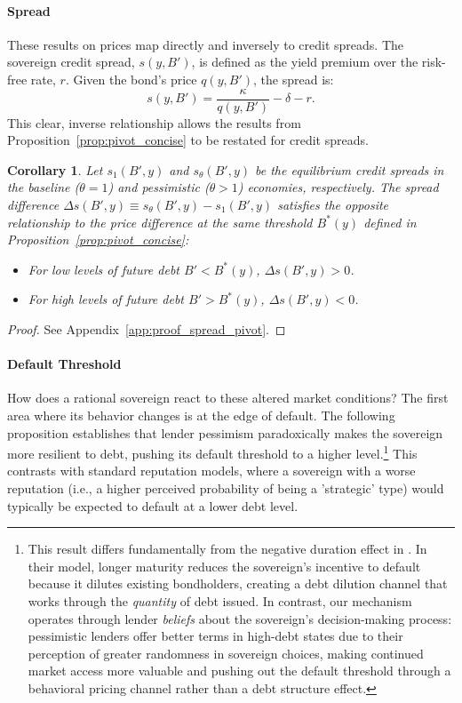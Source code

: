 \documentclass[12pt]{article}
\theoremstyle{plain}
\newtheorem{corollary}{Corollary}
\begin{document}
\paragraph{Spread}
These results on prices map directly and inversely to credit spreads. The
sovereign credit spread, $s(y, B')$, is defined as the yield premium over the
risk-free rate, $r$. Given the bond's price $q(y, B')$, the spread is:
\begin{equation}
	s(y, B') = \frac{\kappa}{q(y, B')} - \delta - r.
	\label{eq:spread_definition}
\end{equation}
This clear, inverse relationship allows the results from Proposition~\ref{prop:pivot_concise} to be restated for credit spreads.

\begin{corollary}
	\label{cor:spread_pivot}
	Let $s_1(B', y)$ and $s_\theta(B', y)$ be the equilibrium credit spreads in the baseline ($\theta=1$) and pessimistic ($\theta>1$) economies, respectively. The spread difference $\Delta s(B', y) \equiv s_\theta(B', y) - s_1(B', y)$ satisfies the opposite relationship to the price difference at the same threshold $B^*(y)$ defined in Proposition~\ref{prop:pivot_concise}:
	\begin{itemize}
		\item For low levels of future debt $B' < B^*(y)$, $\Delta s(B', y) > 0$.
		\item For high levels of future debt $B' > B^*(y)$, $\Delta s(B', y) < 0$.
	\end{itemize}
\end{corollary}

\begin{proof}
	See Appendix~\ref{app:proof_spread_pivot}.
\end{proof}

\paragraph{Default Threshold}
How does a rational sovereign react to these altered market conditions? The
first area where its behavior changes is at the edge of default. The following
proposition establishes that lender pessimism paradoxically makes the sovereign
more resilient to debt, pushing its default threshold to a higher
level.\footnote{This result differs fundamentally from the negative duration
	effect in \citep{ChatterjeeEyigungor2012}. In their model, longer maturity
	reduces the sovereign's incentive to default because it dilutes existing
	bondholders, creating a debt dilution channel that works through the
	\emph{quantity} of debt issued. In contrast, our mechanism operates through
	lender \emph{beliefs} about the sovereign's decision-making process:
	pessimistic lenders offer better terms in high-debt states due to their
	perception of greater randomness in sovereign choices, making continued market
	access more valuable and pushing out the default threshold through a behavioral
	pricing channel rather than a debt structure effect.} This contrasts with
standard reputation models, where a sovereign with a worse reputation (i.e., a
higher perceived probability of being a 'strategic' type) would typically be
expected to default at a lower debt level.
\end{document}

